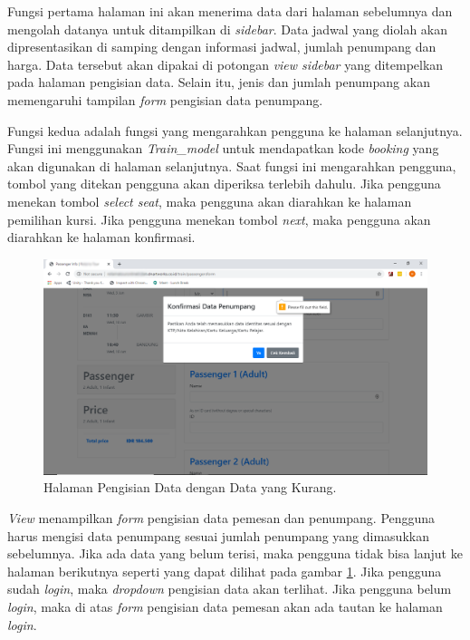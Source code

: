 Fungsi pertama halaman ini akan menerima data dari halaman sebelumnya dan mengolah datanya untuk ditampilkan di \textit{sidebar}. Data jadwal yang diolah akan dipresentasikan di samping dengan informasi jadwal, jumlah penumpang dan harga. Data tersebut akan dipakai di potongan \textit{view sidebar} yang ditempelkan pada halaman pengisian data. Selain itu, jenis dan jumlah penumpang akan memengaruhi tampilan \textit{form} pengisian data penumpang. 

Fungsi kedua adalah fungsi yang mengarahkan pengguna ke halaman selanjutnya. Fungsi ini menggunakan \textit{Train\_model} untuk mendapatkan kode \textit{booking} yang akan digunakan di halaman selanjutnya. Saat fungsi ini mengarahkan pengguna, tombol yang ditekan pengguna akan diperiksa terlebih dahulu. Jika pengguna menekan tombol \textit{select seat}, maka pengguna akan diarahkan ke halaman pemilihan kursi. Jika pengguna menekan tombol \textit{next}, maka pengguna akan diarahkan ke halaman konfirmasi.

\begin{figure}[H]
        \center
        \includegraphics[width=\textwidth,height=\textheight,keepaspectratio]{Gambar/Data belum terisi pengisian data penumpang.png}
        \caption{Halaman Pengisian Data dengan Data yang Kurang.}
            \label{img:isidatakurang}
        \end{figure}

\textit{View} menampilkan \textit{form} pengisian data pemesan dan penumpang. Pengguna harus mengisi data penumpang sesuai jumlah penumpang yang dimasukkan sebelumnya. Jika ada data yang belum terisi, maka pengguna tidak bisa lanjut ke halaman berikutnya seperti yang dapat dilihat pada gambar \ref{img:isidatakurang}.
Jika pengguna sudah \textit{login}, maka \textit{dropdown} pengisian data akan terlihat. Jika pengguna belum \textit{login}, maka di atas \textit{form} pengisian data pemesan akan ada tautan ke halaman \textit{login}.

